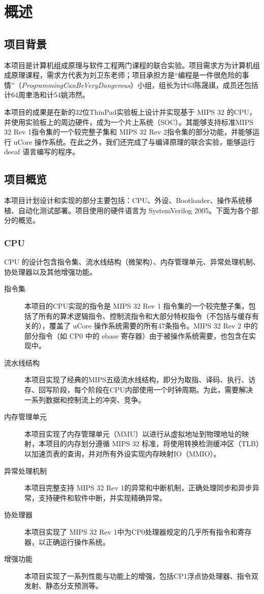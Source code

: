 \chapter{概述}

\section{项目背景}

本项目是计算机组成原理与软件工程两门课程的联合实验。项目需求方为计算机组成原理课程，需求方代表为刘卫东老师；项目承担方是“编程是一件很危险的事情”（\textit{ProgrammingCanBeVeryDangerous}）小组，组长为计63陈晟祺，成员还包括计64周聿浩和计54姚沛然。

本项目的成果是在新的32位ThinPad实验板上设计并实现基于 MIPS 32 的CPU，并使用实验板上的周边硬件，成为一个片上系统（SOC）。其能够支持标准MIPS 32 Rev 1指令集的一个较完整子集和 MIPS 32 Rev 2指令集的部分功能，并能够运行 uCore 操作系统。在此之外，我们还完成了与编译原理的联合实验，能够运行 decaf 语言编写的程序。

\section{项目概览}

本项目计划设计和实现的部分主要包括：CPU、外设、Bootloader、操作系统移植、自动化测试部署。项目使用的硬件语言为 SystemVerilog 2005。下面为各个部分的概览。

\subsection{CPU}

CPU 的设计包含指令集、流水线结构（微架构）、内存管理单元、异常处理机制、协处理器以及其他增强功能。

\begin{description}

    \item[指令集] 本项目的CPU实现的指令是 MIPS 32 Rev 1 指令集的一个较完整子集，包括了所有的算术逻辑指令、控制流指令和大部分特权指令（不包括与缓存有关的），覆盖了 uCore 操作系统需要的所有47条指令。MIPS 32 Rev 2 中的部分指令（如 CP0 中的 ebase 寄存器）由于被操作系统需要，也包含在实现中。
    \item[流水线结构] 本项目实现了经典的MIPS五级流水线结构，即分为取指、译码、执行、访存、回写阶段，每个阶段在CPU内部使用一个时钟周期。为此，需要解决一系列数据和控制流上的冲突、竞争。
    \item[内存管理单元] 本项目实现了内存管理单元（MMU）以进行从虚拟地址到物理地址的映射，本项目的内存划分遵循 MIPS 32 标准，将使用转换检测缓冲区（TLB）以加速页表的查询，并对所有外设实现内存映射IO（MMIO）。
    \item[异常处理机制] 本项目完整支持 MIPS 32 Rev 1的异常和中断机制，正确处理同步和异步异常，支持硬件和软件中断，并实现精确异常。
    \item[协处理器] 本项目实现了 MIPS 32 Rev 1中为CP0处理器规定的几乎所有指令和寄存器，以正确运行操作系统。
    \item[增强功能] 本项目实现了一系列性能与功能上的增强，包括CP1浮点协处理器、指令双发射、静态分支预测等。

\end{description}

